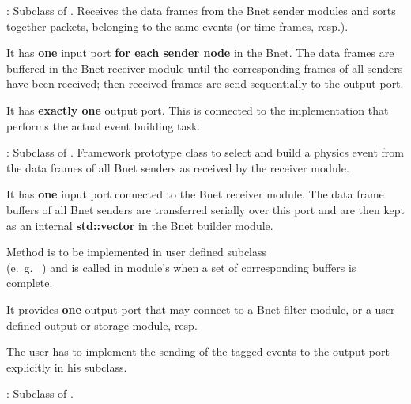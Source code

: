 \begin{description}
\begin{compactenum}
\end{compactenum}
\item[\class{bnet::ReceiverModule}] : 
Subclass of . 
   Receives the data frames from the Bnet sender modules and 
   sorts together packets, belonging to the same events (or time frames, resp.).
\begin{compactenum}
  \item It has {\bf one} input port {\bf for each sender node} in the Bnet. 
      The data frames are buffered in the Bnet receiver module until the 
      corresponding frames of all senders have been received; then received 
      frames are send sequentially to the output port.
  \item It has {\bf exactly one} output port. This is connected to the 
       implementation 
      that performs the actual event building task.
\end{compactenum}
\item[\class{bnet::BuilderModule}] : 
	Subclass of . 
   Framework prototype class to select and build a physics event from 
   the data frames of all Bnet senders as received by the receiver module.
\begin{compactenum}
  \item It has {\bf one} input port connected to the Bnet receiver module. 
      The data frame buffers of all Bnet senders are transferred serially 
      over this port and are then kept as an internal {\bf std::vector} in the Bnet builder module.
  \item Method  is to be implemented in user defined subclass \\
      (e.~g.~ ) and is called in module's 
       when a set of corresponding buffers is complete.
  \item It provides {\bf one} output port that may connect to a 
      Bnet filter module, or a user defined output or storage module, resp. 
  \item The user has to implement the sending of the tagged 
      events to the output port explicitly in his subclass. 
\end{compactenum}
\item[\class{bnet::FilterModule}] : 
Subclass of . 

\end{description}
